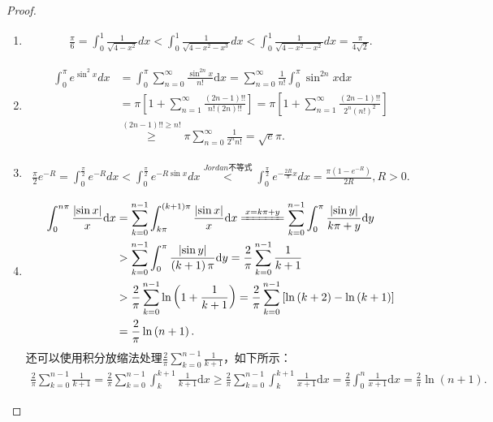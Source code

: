 \documentclass[../../main.tex]{subfiles}
\begin{document}
\begin{proof}
\begin{enumerate}
\item \begin{align*}
\frac{\pi}{6}=\int_{0}^{1}\frac{1}{\sqrt{4 - x^{2}}}dx < \int_{0}^{1}\frac{1}{\sqrt{4 - x^{2}-x^{3}}}dx < \int_{0}^{1}\frac{1}{\sqrt{4 - x^{2}-x^{2}}}dx=\frac{\pi}{4\sqrt{2}}.
\end{align*}

\item \begin{align*}
\int_0^{\pi}{e^{\sin ^2x}dx}&=\int_0^{\pi}{\sum_{n=0}^{\infty}{\frac{\sin ^{2n}x}{n!}}\mathrm{d}x}=\sum_{n=0}^{\infty}{\frac{1}{n!}\int_0^{\pi}{\sin ^{2n}x\mathrm{d}x}}
\\
&=\pi \left[ 1+\sum_{n=1}^{\infty}{\frac{(2n-1)!!}{n!(2n)!!}} \right] =\pi \left[ 1+\sum_{n=1}^{\infty}{\frac{(2n-1)!!}{2^n\left( n! \right) ^2}} \right] 
\\
&\overset{(2n-1)!!\geqslant n!}{\geqslant}\pi \sum_{n=0}^{\infty}{\frac{1}{2^nn!}}=\sqrt{e}\pi .
\end{align*}

\item \begin{align*}
\frac{\pi}{2}e^{-R}=\int_{0}^{\frac{\pi}{2}}e^{-R}dx < \int_{0}^{\frac{\pi}{2}}e^{-R\sin x}dx\stackrel{\hyperref[theorem:Jordan不等式]{Jordan\text{不等式}}}{<}\int_{0}^{\frac{\pi}{2}}e^{-\frac{2R}{\pi}x}dx=\frac{\pi(1 - e^{-R})}{2R}, R > 0.
\end{align*} 

\item \begin{align*}
\int_0^{n\pi}{\frac{\left| \sin x \right|}{x}\mathrm{d}x}&=\sum_{k=0}^{n-1}{\int_{k\pi}^{\left( k+1 \right) \pi}{\frac{\left| \sin x \right|}{x}\mathrm{d}x}}\xlongequal{x=k\pi +y}\sum_{k=0}^{n-1}{\int_0^{\pi}{\frac{\left| \sin y \right|}{k\pi +y}\mathrm{d}y}}
\\
&>\sum_{k=0}^{n-1}{\int_0^{\pi}{\frac{\left| \sin y \right|}{\left( k+1 \right) \pi}\mathrm{d}y}}=\frac{2}{\pi}\sum_{k=0}^{n-1}{\frac{1}{k+1}}
\\
&>\frac{2}{\pi}\sum_{k=0}^{n-1}{\ln \left( 1+\frac{1}{k+1} \right)}=\frac{2}{\pi}\sum_{k=0}^{n-1}{\left[ \ln \left( k+2 \right) -\ln \left( k+1 \right) \right]}
\\
&=\frac{2}{\pi}\ln \left( n+1 \right) .
\end{align*}
还可以使用积分放缩法处理$\frac{2}{\pi}\sum_{k=0}^{n-1}{\frac{1}{k+1}}$，如下所示：
\begin{align*}
\frac{2}{\pi}\sum_{k=0}^{n-1}{\frac{1}{k+1}}=\frac{2}{\pi}\sum_{k=0}^{n-1}{\int_k^{k+1}{\frac{1}{k+1}\mathrm{d}x}}\geqslant \frac{2}{\pi}\sum_{k=0}^{n-1}{\int_k^{k+1}{\frac{1}{x+1}\mathrm{d}x}}=\frac{2}{\pi}\int_0^n{\frac{1}{x+1}\mathrm{d}x}=\frac{2}{\pi}\ln \left( n+1 \right) .
\end{align*}
\end{enumerate}
\end{proof}
\end{document}
